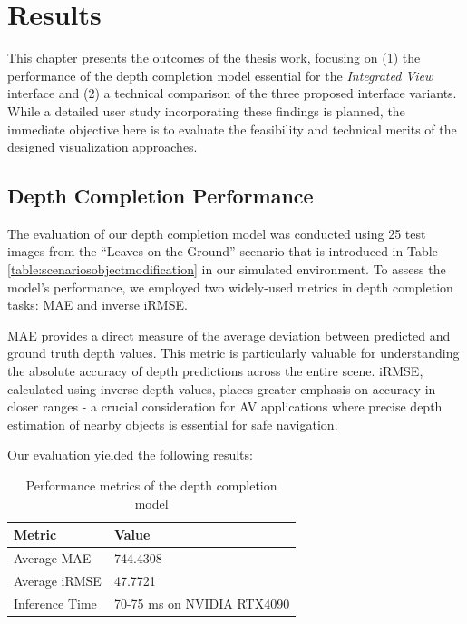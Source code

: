 
\chapter{Results}\label{chapter:results}
This chapter presents the outcomes of the thesis work, focusing on (1) the performance of the depth completion model essential for the \emph{Integrated View} interface and (2) a technical comparison of the three proposed interface variants. While a detailed user study incorporating these findings is planned, the immediate objective here is to evaluate the feasibility and technical merits of the designed visualization approaches.
\section{Depth Completion Performance}

The evaluation of our depth completion model was conducted using 25 test images from the ``Leaves on the Ground'' scenario that is introduced in Table \ref{table:scenariosobjectmodification} in our simulated environment. To assess the model's performance, we employed two widely-used metrics in depth completion tasks: \ac{MAE} and inverse \ac{iRMSE}.

\ac{MAE} provides a direct measure of the average deviation between predicted and ground truth depth values. This metric is particularly valuable for understanding the absolute accuracy of depth predictions across the entire scene. \ac{iRMSE}, calculated using inverse depth values, places greater emphasis on accuracy in closer ranges - a crucial consideration for \ac{AV} applications where precise depth estimation of nearby objects is essential for safe navigation.

Our evaluation yielded the following results:
\begin{table}[h]
\centering
\begin{tabular}{ll}
\hline
\textbf{Metric} & \textbf{Value} \\
\hline
Average \ac{MAE} & 744.4308 \\
Average \ac{iRMSE} & 47.7721 \\
Inference Time & 70-75 ms on NVIDIA RTX4090 \\
\hline
\end{tabular}
\caption{Performance metrics of the depth completion model}
\label{tab:depth_metrics}
\end{table}


